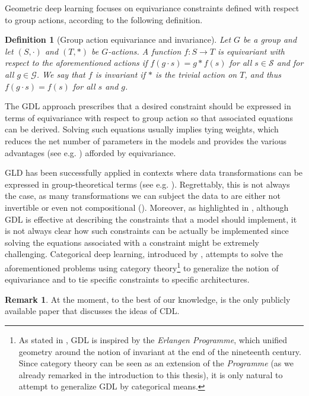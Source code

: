 \documentclass[11pt,a4paper,openright,twoside]{report}
\newcounter{mycounter}
\theoremstyle{plain}
\newtheorem{definition}[mycounter]{Definition}
\theoremstyle{definition}
\newtheorem{remark}[mycounter]{Remark}
\begin{document}
Geometric deep learning focuses on equivariance constraints defined with respect to group actions, according to the following definition.

\begin{definition}[Group action equivariance and invariance]
  \label{def: equivariance}
  Let $G$ be a group and let $(S, \cdot)$ and $(T, \ast)$ be $G$-actions. A function $f: S \to T$ is equivariant with respect to the aforementioned actions if $f(g \cdot s) = g \ast f(s)$ for all $s \in \mathcal{S}$ and for all $g \in \mathcal{G}$. We say that $f$ is invariant if $\ast$ is the trivial action on $T$, and thus $f(g \cdot s) = f(s)$ for all $s$ and $g$.
\end{definition}

The GDL approach prescribes that a desired constraint should be expressed in terms of equivariance with respect to group action so that associated equations can be derived. Solving such equations usually implies tying weights, which reduces the net number of parameters in the models and provides the various advantages (see e.g. \cite{olah2020naturally}) afforded by equivariance.


GLD has been successfully applied in contexts where data transformations can be expressed in group-theoretical terms (see e.g. \cite{bronstein2021geometric}). Regrettably, this is not always the case, as many transformations we can subject the data to are either not invertible or even not compositional (\cite{gavranovicposition}). Moreover, as highlighted in \cite{gavranovicposition}, although GDL is effective at describing the constraints that a model should implement, it is not always clear how such constraints can be actually be implemented since solving the equations associated with a constraint might be extremely challenging.  
Categorical deep learning, introduced by \cite{gavranovicposition}, attempts to solve the aforementioned problems using category theory\footnote{As stated in \cite{bronstein2021geometric}, GDL is inspired by the \textit{Erlangen Programme}, which unified geometry around the notion of invariant at the end of the nineteenth century. Since category theory can be seen as an extension of the \textit{Programme} (as we already remarked in the introduction to this thesis), it is only natural to attempt to generalize GDL by categorical means.} to generalize the notion of equivariance and to tie specific constraints to specific architectures.

\begin{remark}
  At the moment, to the best of our knowledge,  \cite{gavranovicposition} is the only publicly available paper that discusses the ideas of CDL. 
\end{remark}
\end{document}
